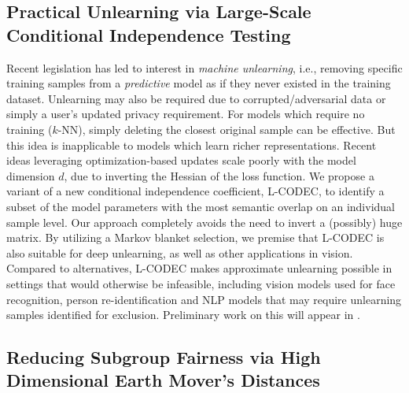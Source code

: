 \subsection{Practical Unlearning via Large-Scale Conditional Independence Testing}

Recent legislation has
led to interest in {\em machine unlearning}, i.e., removing specific training samples from a {\em predictive} model as if they never existed in the training dataset. 
Unlearning may also be required due to  corrupted/adversarial data or simply a user's updated privacy requirement.
For models which require no training ($k$-NN), 
simply deleting the closest original sample can be effective. 
But this idea is inapplicable to models which learn richer 
representations.
Recent ideas leveraging optimization-based updates
scale poorly with the model dimension $d$,  
due to 
inverting the Hessian of the loss function. %
We propose
a variant of a new conditional independence coefficient, 
L-CODEC, to identify a subset of the model parameters with the most semantic overlap on an individual sample level. 
Our approach completely avoids the need to invert a (possibly) huge matrix. 
By utilizing a Markov blanket selection, 
we premise
that L-CODEC is also suitable for deep unlearning,
as well as other applications in vision.
Compared to alternatives, L-CODEC makes approximate unlearning possible 
in settings that would otherwise be infeasible, 
including vision models used for face recognition, 
person re-identification 
and NLP models that may require unlearning samples identified for exclusion.
Preliminary work on this will appear in \citep{lcodec}.


\subsection{Reducing Subgroup Fairness via High Dimensional Earth Mover's Distances}

